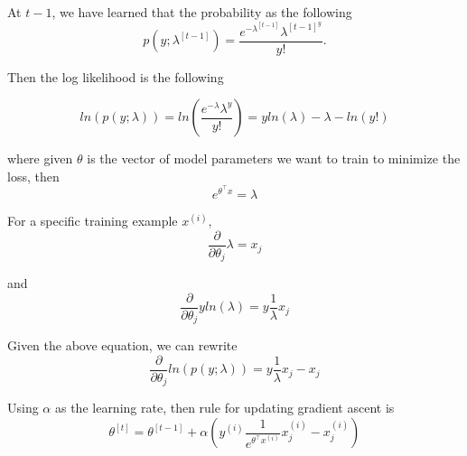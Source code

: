 \begin{answer}

At $t-1$, we have learned that the probability as the following
\begin{equation*}
  p(y; \lambda^{[t-1]}) = \frac{e^{-\lambda^{[t-1]}}\lambda^{[t-1]}^y}{y!}.
\end{equation*}

Then the log likelihood is the following

\begin{equation*}
    ln(p(y; \lambda)) = ln\left( \frac{e^{-\lambda}\lambda^y}{y!} \right) = yln(\lambda) - \lambda - ln(y!)
\end{equation*}

where given $\theta$ is the vector of model parameters we want to train to minimize the loss, then
\begin{equation}
    e^{\theta^\top x} = \lambda
\end{equation}

For a specific training example $x^{(i)}$,
\begin{equation}
    \frac{\partial}{\partial \theta_j} \lambda = x_j
\end{equation}


and
\begin{equation}
     \frac{\partial}{\partial \theta_j} y ln(\lambda) = y\frac{1}{\lambda} x_j
\end{equation}

Given the above equation, we can rewrite
\begin{equation}
    \frac{\partial}{\partial \theta_j}ln(p(y; \lambda)) = y\frac{1}{\lambda} x_j - x_j
\end{equation}

Using $\alpha$ as the learning rate, then rule for updating gradient ascent is 
\begin{equation}
    \theta^{[t]} = \theta^{[t - 1]} + \alpha \left( y^{(i)}\frac{1}{e^{\theta^\top x^{(i)}}} x^{(i)}_j - x^{(i)}_j \right)
\end{equation}


\end{answer}
